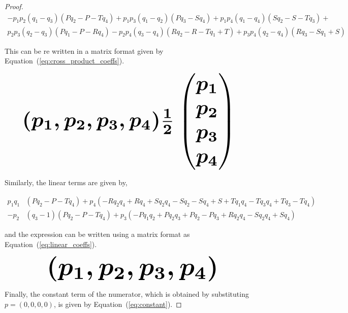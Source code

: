 \begin{proof}
\begingroup
\footnotesize
\begin{align*}
- p_{1} p_{2} (q_{1} - q_{3}) (P q_{2} - P - T q_{4}) + p_{1} p_{3} (q_{1} - q_{2}) (P q_{3} - S q_{4}) + p_{1} p_{4} (q_{1} - q_{4}) (S q_{2} - S - T q_{3}) + \\
p_{2} p_{3} (q_{2} - q_{3}) (P q_{1} - P - R q_{4}) - p_{2} p_{4} (q_{3} - q_{4}) (R q_{2} - R - T q_{1} + T) + p_{3} p_{4} (q_{2} - q_{4}) (R q_{3} - S q_{1} + S)
\end{align*}
\endgroup

This can be re written in a matrix format given by
Equation~(\ref{eq:cross_product_coeffs}).

\begin{equation}\label{eq:cross_product_coeffs}
    \resizebox{0.9\linewidth}{!}{\arraycolsep=2.5pt%
    \boldmath\(
    (p_1, p_2, p_3, p_4) \frac{1}{2}  \begin{pmatrix}
    p_1 \\
    p_2 \\
    p_3 \\
    p_4 \end{pmatrix}
    \) }
\end{equation}

Similarly, the linear terms are given by,

\begingroup
\footnotesize
\begin{align*}
p_{1} q_{1} & (P q_{2} - P - T q_{4}) + p_{4} (- R q_{2} q_{4} + R q_{4} + S q_{2} q_{4} - S q_{2} - S q_{4} + S + T q_{1} q_{4} - T q_{3} q_{4} + T q_{3} - T q_{4})\\
- p_{2} & (q_{3} - 1) (P q_{2} - P - T q_{4}) + p_{3} (- P q_{1} q_{2} + P q_{2} q_{3} + P q_{2} - P q_{3} + R q_{2} q_{4} - S q_{2} q_{4} + S q_{4})
\end{align*}
\endgroup

and the expression can be written using a matrix format as
Equation~(\ref{eq:linear_coeffs}).

\begin{equation}\label{eq:linear_coeffs}
    \resizebox{0.7\linewidth}{!}{\arraycolsep=2.5pt%
    \boldmath\(
    (p_1, p_2, p_3, p_4) \)}
\end{equation}

Finally, the constant term of the numerator, which is obtained by
substituting $p=(0, 0, 0, 0)$, is given by Equation~(\ref{eq:constant}).


\end{proof}
